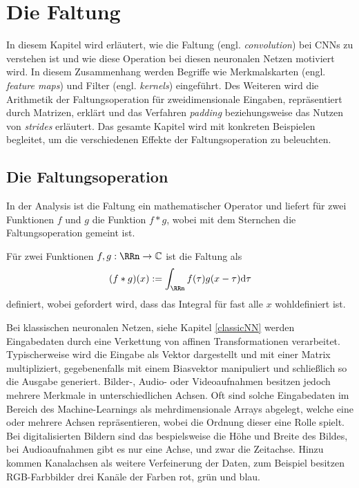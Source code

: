 \chapter{Die Faltung}
In diesem Kapitel wird erläutert, wie die Faltung (engl. \textit{convolution}) bei CNNs zu verstehen ist und wie diese Operation bei diesen neuronalen Netzen motiviert wird. In diesem Zusammenhang werden Begriffe wie Merkmalskarten (engl. \textit{feature maps}) und Filter (engl. \textit{kernels}) eingeführt. Des Weiteren wird die Arithmetik der Faltungsoperation für zweidimensionale Eingaben, repräsentiert durch Matrizen, erklärt und das Verfahren \textit{padding} beziehungsweise das Nutzen von \textit{strides} erläutert. Das gesamte Kapitel wird mit konkreten Beispielen begleitet, um die verschiedenen Effekte der Faltungsoperation zu beleuchten.

\section{Die Faltungsoperation}
In der Analysis ist die Faltung ein mathematischer Operator und liefert für zwei Funktionen $f$ und $g$ die Funktion $ f \ast g$, wobei mit dem Sternchen die Faltungsoperation gemeint ist.

\begin{defi}[Faltung]\label{allg_faltung}
    Für zwei Funktionen $f,g: \RRn \rightarrow \mathbb{C}$ ist die Faltung als
    \begin{equation*}
        (f \ast g) (x) := \int_{\RRn} f(\tau) g(x-\tau) \mathrm{d} \tau
    \end{equation*}
    definiert, wobei gefordert wird, dass das Integral für fast alle $x$ wohldefiniert ist.
   \end{defi}

Bei klassischen neuronalen Netzen, siehe Kapitel \ref{classicNN} werden Eingabedaten durch eine Verkettung von affinen Transformationen verarbeitet. Typischerweise wird die Eingabe als Vektor dargestellt und  mit einer Matrix multipliziert, gegebenenfalls mit einem Biasvektor manipuliert und schließlich so die Ausgabe generiert. Bilder-, Audio- oder Videoaufnahmen besitzen jedoch mehrere Merkmale in unterschiedlichen Achsen. Oft sind solche Eingabedaten im Bereich des Machine-Learnings als mehrdimensionale Arrays abgelegt, welche eine oder mehrere Achsen repräsentieren, wobei die Ordnung dieser eine Rolle spielt. Bei digitalisierten Bildern sind das bespielsweise die Höhe und Breite des Bildes, bei Audioaufnahmen gibt es nur eine Achse, und zwar die Zeitachse. Hinzu kommen Kanalachsen als weitere Verfeinerung der Daten, zum Beispiel besitzen RGB-Farbbilder drei Kanäle der Farben rot, grün und blau. 

